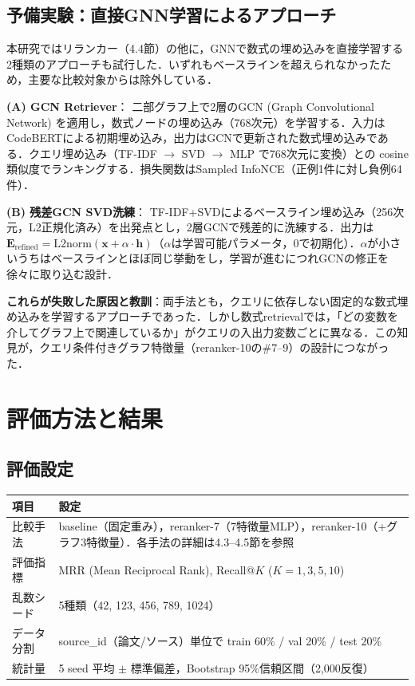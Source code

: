 \documentclass[11pt,a4paper]{ltjsarticle}
\begin{document}
\subsection{予備実験：直接GNN学習によるアプローチ}

本研究ではリランカー（4.4節）の他に，GNNで数式の埋め込みを直接学習する2種類のアプローチも試行した．いずれもベースラインを超えられなかったため，主要な比較対象からは除外している．

\textbf{(A) GCN Retriever}：
二部グラフ上で2層のGCN (Graph Convolutional Network) を適用し，数式ノードの埋め込み（768次元）を学習する．入力はCodeBERTによる初期埋め込み，出力はGCNで更新された数式埋め込みである．クエリ埋め込み（TF-IDF $\to$ SVD $\to$ MLP で768次元に変換）との cosine類似度でランキングする．損失関数はSampled InfoNCE（正例1件に対し負例64件）．

\textbf{(B) 残差GCN SVD洗練}：
TF-IDF+SVDによるベースライン埋め込み（256次元，L2正規化済み）を出発点とし，2層GCNで残差的に洗練する．出力は$\mathbf{E}_{\mathrm{refined}} = \mathrm{L2norm}(\mathbf{x} + \alpha \cdot \mathbf{h})$（$\alpha$は学習可能パラメータ，0で初期化）．$\alpha$が小さいうちはベースラインとほぼ同じ挙動をし，学習が進むにつれGCNの修正を徐々に取り込む設計．

\textbf{これらが失敗した原因と教訓}：両手法とも，クエリに依存しない固定的な数式埋め込みを学習するアプローチであった．しかし数式retrievalでは，「どの変数を介してグラフ上で関連しているか」がクエリの入出力変数ごとに異なる．この知見が，クエリ条件付きグラフ特徴量（reranker-10の\#7--9）の設計につながった．

\section{評価方法と結果}

\subsection{評価設定}

\begin{table}[h]
\centering
\begin{tabular}{lp{10cm}}
\toprule
項目 & 設定 \\
\midrule
比較手法 & baseline（固定重み），reranker-7（7特徴量MLP），reranker-10（+グラフ3特徴量）．各手法の詳細は4.3--4.5節を参照 \\
評価指標 & MRR (Mean Reciprocal Rank), Recall@$K$ ($K=1,3,5,10$) \\
乱数シード & 5種類（42, 123, 456, 789, 1024） \\
データ分割 & source\_id（論文/ソース）単位で train 60\% / val 20\% / test 20\% \\
統計量 & 5 seed 平均 $\pm$ 標準偏差，Bootstrap 95\%信頼区間（2,000反復） \\
\bottomrule
\end{tabular}
\end{table}
\end{document}
